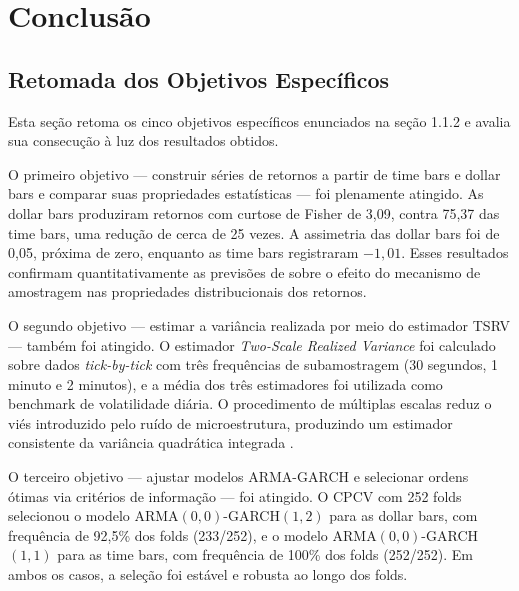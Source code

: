 
\chapter{Conclusão}
\label{cap:conclusao}

\section{Retomada dos Objetivos Específicos}
\label{sec:retomada_objetivos}

Esta seção retoma os cinco objetivos específicos enunciados na seção 1.1.2 e avalia
sua consecução à luz dos resultados obtidos.

O primeiro objetivo — construir séries de retornos a partir de time bars e dollar bars
e comparar suas propriedades estatísticas — foi plenamente atingido. As dollar bars
produziram retornos com curtose de Fisher de 3,09, contra 75,37 das time bars, uma
redução de cerca de 25 vezes. A assimetria das dollar bars foi de 0,05, próxima de zero,
enquanto as time bars registraram $-1{,}01$. Esses resultados confirmam quantitativamente
as previsões de \citet{Prado2018} sobre o efeito do mecanismo de amostragem nas
propriedades distribucionais dos retornos.

O segundo objetivo — estimar a variância realizada por meio do estimador TSRV — também
foi atingido. O estimador \textit{Two-Scale Realized Variance} foi calculado sobre dados
\textit{tick-by-tick} com três frequências de subamostragem (30 segundos, 1 minuto e
2 minutos), e a média dos três estimadores foi utilizada como benchmark de volatilidade
diária. O procedimento de múltiplas escalas reduz o viés introduzido pelo ruído de
microestrutura, produzindo um estimador consistente da variância quadrática integrada
\citep{ZhangMyklandAit2005}.

O terceiro objetivo — ajustar modelos ARMA-GARCH e selecionar ordens ótimas via critérios
de informação — foi atingido. O CPCV com 252 folds selecionou o modelo ARMA$(0,0)$-GARCH$(1,2)$
para as dollar bars, com frequência de 92,5\% dos folds (233/252), e o modelo
ARMA$(0,0)$-GARCH$(1,1)$ para as time bars, com frequência de 100\% dos folds (252/252).
Em ambos os casos, a seleção foi estável e robusta ao longo dos folds.

